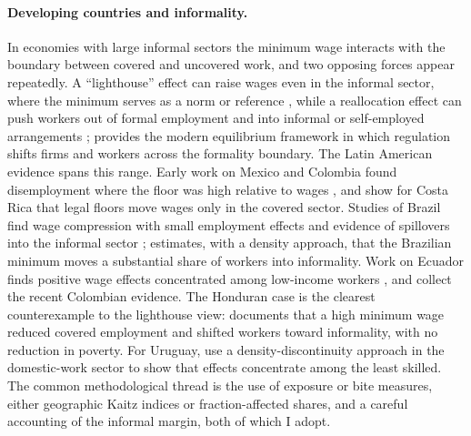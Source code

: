 \paragraph{Developing countries and informality.} In economies with large informal
sectors the minimum wage interacts with the boundary between covered and uncovered
work, and two opposing forces appear repeatedly. A ``lighthouse'' effect can raise
wages even in the informal sector, where the minimum serves as a norm or reference
\citep{lemos_2009, bosch_manacorda_2010, maloney_nunez_2004}, while a reallocation
effect can push workers out of formal employment and into informal or self-employed
arrangements \citep{ham_2018_honduras}; \citet{ulyssea_2018} provides the modern
equilibrium framework in which regulation shifts firms and workers across the
formality boundary. The Latin American evidence spans this range. Early work on
Mexico and Colombia found disemployment where the floor was high relative to wages
\citep{bell_1997}, and \citet{gindling_terrell_2007} show for Costa Rica that legal
floors move wages only in the covered sector. Studies of Brazil find wage compression
with small employment effects and evidence of spillovers into the informal sector
\citep{lemos_2009, lemos_2004}; \citet{jales_2018} estimates, with a density
approach, that the Brazilian minimum moves a substantial share of workers into
informality. Work on Ecuador finds positive wage effects concentrated among
low-income workers \citep{wong_2019_ecuador}, and \citet{arango_2022_colombia}
collect the recent Colombian evidence. The Honduran case is the clearest
counterexample to the lighthouse view: \citet{ham_2018_honduras} documents that a
high minimum wage reduced covered employment and shifted workers toward informality,
with no reduction in poverty. For Uruguay, \citet{katzkowicz_2021_uruguay} use a
density-discontinuity approach in the domestic-work sector to show that effects
concentrate among the least skilled. The common methodological thread is the use of
exposure or bite measures, either geographic Kaitz indices or fraction-affected
shares, and a careful accounting of the informal margin, both of which I adopt.

